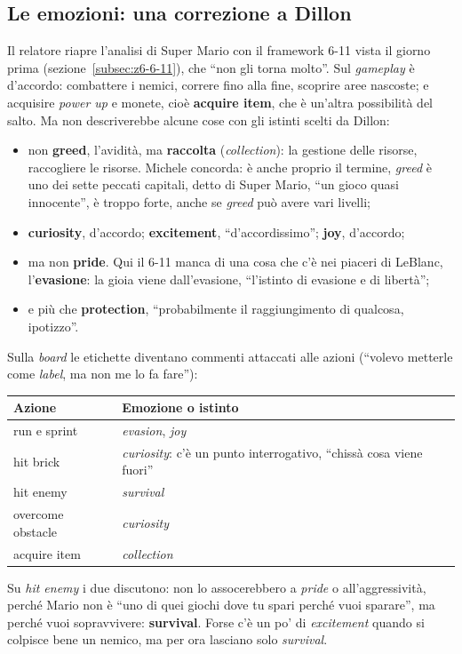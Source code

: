 \subsection{Le emozioni: una correzione a Dillon}

Il relatore riapre l'analisi di Super Mario con il framework 6-11 vista il giorno
prima (sezione~\ref{subsec:z6-6-11}), che ``non gli torna molto''. Sul
\emph{gameplay} è d'accordo: combattere i nemici, correre fino alla fine,
scoprire aree nascoste; e acquisire \emph{power up} e monete, cioè \textbf{acquire
item}, che è un'altra possibilità del salto. Ma non descriverebbe alcune cose con
gli istinti scelti da Dillon:
\begin{itemize}
  \item non \textbf{greed}, l'avidità, ma \textbf{raccolta} (\emph{collection}):
        la gestione delle risorse, raccogliere le risorse. Michele concorda: è
        anche proprio il termine, \emph{greed} è uno dei sette peccati capitali,
        detto di Super Mario, ``un gioco quasi innocente'', è troppo forte,
        anche se \emph{greed} può avere vari livelli;
  \item \textbf{curiosity}, d'accordo; \textbf{excitement}, ``d'accordissimo'';
        \textbf{joy}, d'accordo;
  \item ma non \textbf{pride}. Qui il 6-11 manca di una cosa che c'è nei piaceri
        di LeBlanc, l'\textbf{evasione}: la gioia viene dall'evasione, ``l'istinto
        di evasione e di libertà'';
  \item e più che \textbf{protection}, ``probabilmente il raggiungimento di
        qualcosa, ipotizzo''.
\end{itemize}
Sulla \emph{board} le etichette diventano commenti attaccati alle azioni
(``volevo metterle come \emph{label}, ma non me lo fa fare''):
\begin{center}
\begin{tabular}{@{}lp{}@{}}
  \toprule
  \textbf{Azione} & \textbf{Emozione o istinto} \\
  \midrule
  run e sprint     & \emph{evasion}, \emph{joy} \\
  hit brick        & \emph{curiosity}: c'è un punto interrogativo, ``chissà
                     cosa viene fuori'' \\
  hit enemy        & \emph{survival} \\
  overcome obstacle & \emph{curiosity} \\
  acquire item     & \emph{collection} \\
  \bottomrule
\end{tabular}
\end{center}
Su \emph{hit enemy} i due discutono: non lo assocerebbero a \emph{pride} o
all'aggressività, perché Mario non è ``uno di quei giochi dove tu spari perché
vuoi sparare'', ma perché vuoi sopravvivere: \textbf{survival}. Forse c'è un po'
di \emph{excitement} quando si colpisce bene un nemico, ma per ora lasciano solo
\emph{survival}.

